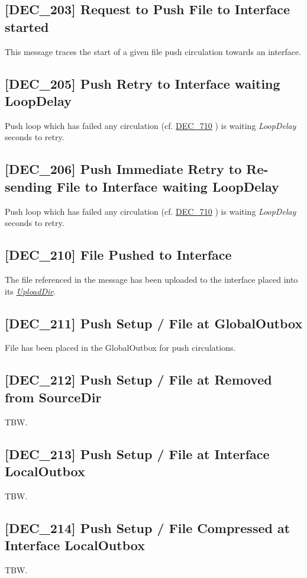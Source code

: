 \documentclass[dec_sum_main.tex]{subfiles}
\begin{document}
\label{DEC203}
\subsection{[DEC\_203] Request to Push File to Interface started}
This message traces the start of a given file push circulation towards an interface.

\label{DEC205}
\subsection{[DEC\_205] Push Retry to Interface waiting LoopDelay}
Push loop which has failed any circulation (cf. \hyperref[DEC710]{DEC\_710} ) is waiting \textit{LoopDelay} seconds to retry.

\label{DEC206}
\subsection{[DEC\_206] Push Immediate Retry to Re-sending File to Interface waiting LoopDelay}
Push loop which has failed any circulation (cf. \hyperref[DEC710]{DEC\_710} ) is waiting \textit{LoopDelay} seconds to retry.


\label{DEC210}
\subsection{[DEC\_210] File Pushed to Interface}
The file referenced in the message has been uploaded to the interface placed into its \hyperref[Upload Rules]{\textit{UploadDir}}.

\label{DEC211}
\subsection{[DEC\_211] Push Setup / File at GlobalOutbox}
File has been placed in the GlobalOutbox for push circulations.

\label{DEC212}
\subsection{[DEC\_212] Push Setup / File at Removed from SourceDir}
TBW.

\label{DEC213}
\subsection{[DEC\_213] Push Setup / File at Interface LocalOutbox}
TBW.

\label{DEC214}
\subsection{[DEC\_214] Push Setup / File Compressed at Interface LocalOutbox}
TBW.
\end{document}
